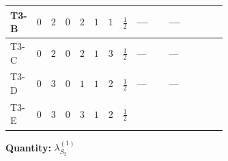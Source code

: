 \documentclass[8pt]{article}
\begin{document}
\begin{landscape}
\begin{longtable}{@{}llcccccc >{\raggedright\arraybackslash}p{0.21\linewidth} >{\raggedright\arraybackslash}p{0.21\linewidth} >{\raggedright\arraybackslash}p{0.21\linewidth}@{}}
\midrule
T3-B & $0$ & $2$ & $0$ & $2$ & $1$ & $1$ & $\frac{1}{2}$ & --- & --- & \scriptsize\adjustbox{max width=\linewidth}{$\begin{gathered} -4 \operatorname{Tr}\!\left({y_2}\,\left({y_2}\right)^{\dagger}\,{y_2}\,\left({y_2}\right)^{\dagger}\right)\end{gathered}$} \\
\midrule
T3-C & $0$ & $2$ & $0$ & $2$ & $1$ & $3$ & $\frac{1}{2}$ & --- & --- & \scriptsize\adjustbox{max width=\linewidth}{$\begin{gathered} -5 \operatorname{Tr}\!\left({y_2}\,\left({y_2}\right)^{\dagger}\,{y_2}\,\left({y_2}\right)^{\dagger}\right)\end{gathered}$} \\
\midrule
T3-D & $0$ & $3$ & $0$ & $1$ & $1$ & $2$ & $\frac{1}{2}$ & --- & --- & \scriptsize\adjustbox{max width=\linewidth}{$\begin{gathered} -8 \operatorname{Tr}\!\left({y_2}\,\left({y_2}\right)^{\dagger}\,{y_2}\,\left({y_2}\right)^{\dagger}\right)\end{gathered}$} \\
\midrule
T3-E & $0$ & $3$ & $0$ & $3$ & $1$ & $2$ & $\frac{1}{2}$ & \scriptsize\adjustbox{max width=\linewidth}{$\begin{gathered} {\lambda_{S_2}^{(1)}} (4 T_{\nu}^{(2)}+14 {\lambda_{S_2}^{(A)}})\end{gathered}$} & \scriptsize\adjustbox{max width=\linewidth}{$\begin{gathered} +2 {\lambda_{S_2}^{(A)}} T_{\nu}^{(2)}\end{gathered}$} & \scriptsize\adjustbox{max width=\linewidth}{$\begin{gathered} -3 \operatorname{Tr}\!\left({y_2}\,\left({y_2}\right)^{\dagger}\,{y_2}\,\left({y_2}\right)^{\dagger}\right)\end{gathered}$} \\
\midrule
\bottomrule
\end{longtable}
\clearpage
\noindent\textbf{Quantity: }$\lambda_{S_2}^{(1)}$\par\smallskip

\end{landscape}
\end{document}
